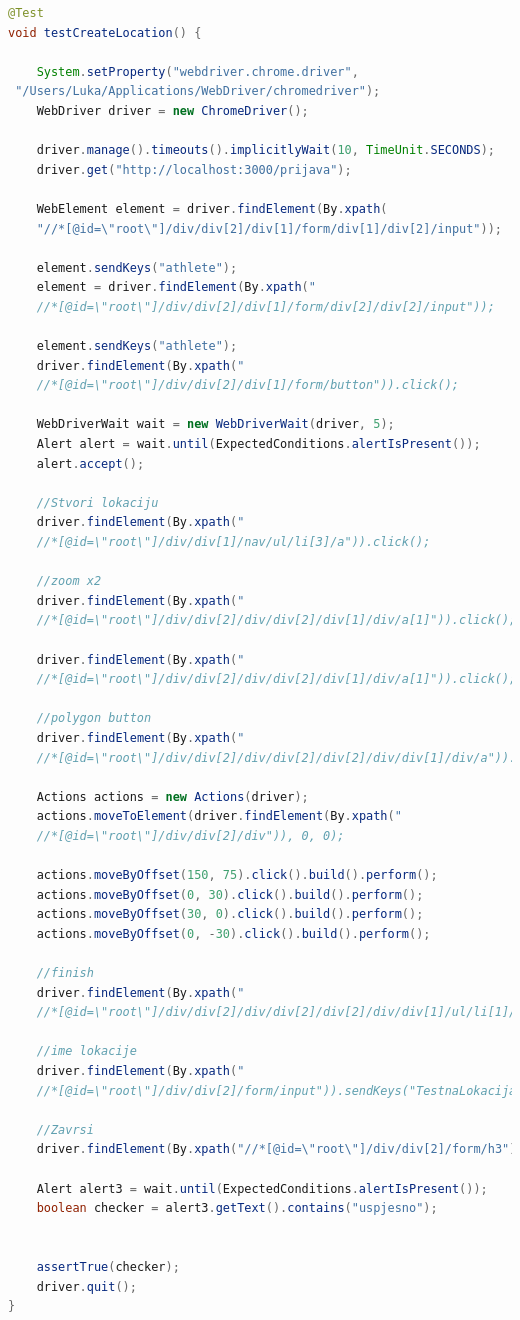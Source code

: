 		\begin{lstlisting}[language=Java,caption={testCreateLocation},label=DescriptiveLabel]
@Test
void testCreateLocation() {
		
	System.setProperty("webdriver.chrome.driver",
 "/Users/Luka/Applications/WebDriver/chromedriver");
	WebDriver driver = new ChromeDriver();

	driver.manage().timeouts().implicitlyWait(10, TimeUnit.SECONDS);
	driver.get("http://localhost:3000/prijava");
	
	WebElement element = driver.findElement(By.xpath(
	"//*[@id=\"root\"]/div/div[2]/div[1]/form/div[1]/div[2]/input"));  
    
	element.sendKeys("athlete");
	element = driver.findElement(By.xpath("
	//*[@id=\"root\"]/div/div[2]/div[1]/form/div[2]/div[2]/input"));
	
	element.sendKeys("athlete");
	driver.findElement(By.xpath("
	//*[@id=\"root\"]/div/div[2]/div[1]/form/button")).click();

	WebDriverWait wait = new WebDriverWait(driver, 5);
	Alert alert = wait.until(ExpectedConditions.alertIsPresent());
	alert.accept();
	
	//Stvori lokaciju
	driver.findElement(By.xpath("
	//*[@id=\"root\"]/div/div[1]/nav/ul/li[3]/a")).click();
	
	//zoom x2
	driver.findElement(By.xpath("
	//*[@id=\"root\"]/div/div[2]/div/div[2]/div[1]/div/a[1]")).click();
	
	driver.findElement(By.xpath("
	//*[@id=\"root\"]/div/div[2]/div/div[2]/div[1]/div/a[1]")).click();
	
	//polygon button
	driver.findElement(By.xpath("
	//*[@id=\"root\"]/div/div[2]/div/div[2]/div[2]/div/div[1]/div/a")).click();

	Actions actions = new Actions(driver);
	actions.moveToElement(driver.findElement(By.xpath("
	//*[@id=\"root\"]/div/div[2]/div")), 0, 0);
	
	actions.moveByOffset(150, 75).click().build().perform();
	actions.moveByOffset(0, 30).click().build().perform();
	actions.moveByOffset(30, 0).click().build().perform();
	actions.moveByOffset(0, -30).click().build().perform();
	
	//finish
	driver.findElement(By.xpath("
	//*[@id=\"root\"]/div/div[2]/div/div[2]/div[2]/div/div[1]/ul/li[1]/a")).click();
	
	//ime lokacije
	driver.findElement(By.xpath("
	//*[@id=\"root\"]/div/div[2]/form/input")).sendKeys("TestnaLokacija");
	
	//Zavrsi
	driver.findElement(By.xpath("//*[@id=\"root\"]/div/div[2]/form/h3")).click();
	
	Alert alert3 = wait.until(ExpectedConditions.alertIsPresent());
	boolean checker = alert3.getText().contains("uspjesno");


	assertTrue(checker);
	driver.quit();
}

		\end{lstlisting}
		
